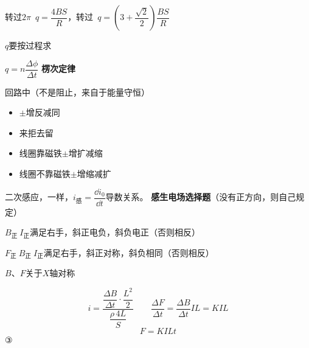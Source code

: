 
转过$2\pi$\ $q=\dfrac{4BS}{R}$，转过\ $q=\left(3+\dfrac{\sqrt{2}}{2}\right)\dfrac{BS}{R}$

$q$要按过程求

$q=n\dfrac{\Delta\phi}{\Delta t}$ %
\textbf{楞次定律}

回路中（不是阻止，来自于能量守恒）

\begin{itemize}
\item $\pm$增反减同
\item 来拒去留
\item 线圈靠磁铁\quad $\pm$增扩减缩
\item 线圈不靠磁铁\quad $\pm$增缩减扩
\end{itemize}

二次感应，一样，$i_{\text{感}}=\dfrac{\dd i_{0}}{\dd t}$\quad 导数关系。 %
\textbf{感生电场选择题}（没有正方向，则自己规定）

$B_{\text{正}}\ I_{\text{正}}$\quad 满足右手，斜正电负，斜负电正（否则相反）

$F_{\text{正}}\ B_{\text{正}}\ I_{\text{正}}$\quad 满足右手，斜正对称，斜负相同（否则相反）

$B$、$F$关于$X$轴对称

\[ i=\dfrac{\dfrac{\Delta B}{\Delta t}\cdot\dfrac{L^{2}}{2}}{\dfrac{\rho\,4L}{S}}\qquad
\dfrac{\Delta F}{\Delta t}=\dfrac{\Delta B}{\Delta t}IL=KIL \]
\[ F=KILt \]
③

